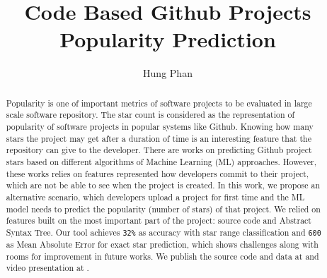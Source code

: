 \documentclass[sigconf]{acmart}
\title[CodeBasedStarPrediction]{Code Based Github Projects Popularity Prediction}
\author[1]{Hung Phan}
\affil[1]{Computer Science Department, Iowa State University}
\begin{document}
\begin{abstract}
Popularity is one of important metrics of software projects to be evaluated in large scale software repository. The star count is considered as the representation of popularity of software projects in popular systems like Github. Knowing how many stars the project may get after a duration of time is an interesting feature that the repository can give to the developer. There are works on predicting Github project stars based on different algorithms of Machine Learning (ML) approaches. However, these works relies on features represented how developers commit to their project, which are not be able to see when the project is created. In this work, we propose an alternative scenario, which developers upload a project for first time and the ML model needs to predict the popularity (number of stars) of that project. We relied on features built on the most important part of the project: source code and Abstract Syntax Tree. Our tool achieves \texttt{32\%} as accuracy with star range classification and \texttt{600} as Mean Absolute Error for exact star prediction, which shows challenges along with rooms for improvement in future works. We publish the source code and data at \cite{001} and video presentation at \cite{014}.
\end{abstract}





\maketitle








\clearpage



\end{document}
